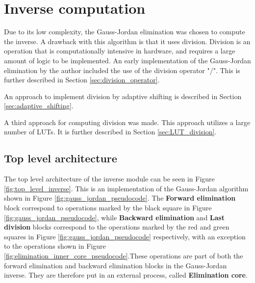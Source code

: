 \section{Inverse computation}
\label{sec:inverse_computation_hw}
Due to its low complexity, the Gauss-Jordan elimination was chosen to compute the inverse. A drawback with this algorithm is that it uses division. Division is an operation that is computationally intensive in hardware, and requires a large amount of logic to be implemented. An early implementation of the Gauss-Jordan elimination by the author included the use of the division operator "/". This is further described in Section \ref{sec:division_operator}.



An approach to implement division by adaptive shifting is described in Section \ref{sec:adaptive_shifting}. 

A third approach for computing division was made. This approach utilizes a large number of LUTs. It is further described in Section \ref{sec:LUT_division}.



\subsection{Top level architecture}
The top level architecture of the inverse module can be seen in Figure \ref{fig:top_level_inverse}. This is an implementation of the Gauss-Jordan algorithm shown in Figure \ref{fig:gauss_jordan_pseudocode}. The \textbf{Forward elimination} block correspond to operations marked by the black square in Figure \ref{fig:gauss_jordan_pseudocode}, while \textbf{Backward elimination} and \textbf{Last division} blocks correspond to the operations marked by the red and green squares in Figure \ref{fig:gauss_jordan_pseudocode} respectively, with an exception to the operations shown in Figure \ref{fig:elimination_inner_core_pseudocode}.These operations are part of both the forward elimination and backward elimination blocks in the Gauss-Jordan inverse. They are therefore put in an external process, called \textbf{Elimination core}. 
\\


